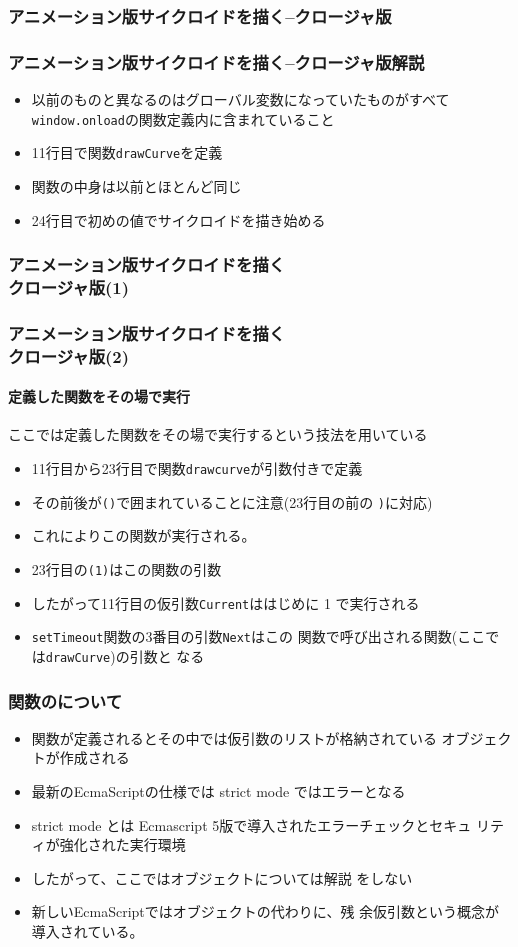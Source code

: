 \begin{frame}[containsverbatim]
 \frametitle{アニメーション版サイクロイドを描く--クロージャ版}
\end{frame}
\begin{frame}[containsverbatim]
 \frametitle{アニメーション版サイクロイドを描く--クロージャ版解説}
 \begin{itemize}
	\item 以前のものと異なるのはグローバル変数になっていたものがすべて
				\Verb+window.onload+の関数定義内に含まれていること
	\item 11行目で関数\Verb+drawCurve+を定義
	\item 関数の中身は以前とほとんど同じ
	\item 24行目で初めの値でサイクロイドを描き始める
 \end{itemize}
\end{frame}
\begin{frame}[containsverbatim]
 \frametitle{アニメーション版サイクロイドを描く\\クロージャ版(1)}
\end{frame}
\begin{frame}[containsverbatim]
 \frametitle{アニメーション版サイクロイドを描く\\クロージャ版(2)}
 \framesubtitle{定義した関数をその場で実行}
 ここでは定義した関数をその場で実行するという技法を用いている
 \begin{itemize}
	\item 11行目から23行目で関数\texttt{drawcurve}が引数付きで定義
	\item その前後が\Verb+()+で囲まれていることに注意(23行目の前の
				\texttt{)}に対応)
	\item これによりこの関数が実行される。
	\item 23行目の\Verb+(1)+はこの関数の引数
	\item したがって11行目の仮引数\Verb+Current+ははじめに 1 で実行される
	\item \Verb+setTimeout+関数の3番目の引数\Verb+Next+はこの%
				関数で呼び出される関数(ここでは\Verb+drawCurve+)の引数と
				なる
 \end{itemize}
\end{frame}
\begin{frame}[containsverbatim]
 \frametitle{関数のについて}
 \begin{itemize}
	\item 関数が定義されるとその中では仮引数のリストが格納されている
				オブジェクトが作成される
	\item 最新のEcmaScriptの仕様では strict mode ではエラーとなる
	\item strict mode とは Ecmascript 5版で導入されたエラーチェックとセキュ
				リティが強化された実行環境
	\item したがって、ここではオブジェクトについては解説
				をしない
	\item 新しいEcmaScriptではオブジェクトの代わりに、残
				余仮引数という概念が導入されている。
 \end{itemize}
\end{frame}
